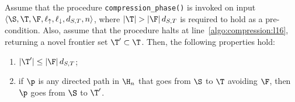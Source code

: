 \begin{proposition}\label{prop:compressed_frontier}
Assume that the procedure \texttt{compression\_phase()} is invoked on input
$\langle \S, \T, \F, \ell_\uparrow, \ell_\downarrow, d_{S,T}, n \rangle$,
where $|\T| > |\F|\, d_{S,T}$ is required to hold as a pre-condition.
Also, assume that the procedure halts at line~\ref{algo:compression:l16}, returning a novel frontier set $\T'\subset \T$.
Then, the following properties hold:
\begin{enumerate}
\item $|\T'|\leq |\F|\, d_{S,T}$;
\item if $\p$ is any directed path  in $\H_n$ that goes from $\S$ to $\T$ avoiding $\F$, then $\p$ goes from $\S$ to $\T'$.
\end{enumerate}
\end{proposition}
